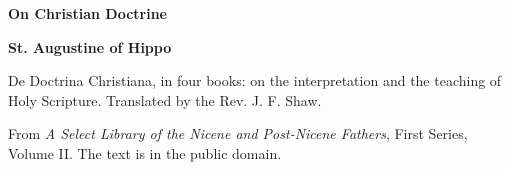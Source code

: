 \documentclass[11pt,letterpaper]{article}
\begin{document}
\color{ink}

\begin{titlepage}
\centering
\vspace*{4em}
{\LARGE\bfseries\color{heading} On Christian Doctrine\par}
\vspace{2em}
{\Large\bfseries\color{heading} St. Augustine of Hippo\par}
\vspace{2.5em}
{\itshape\color{subhead}\parbox{0.8\linewidth}{\centering De Doctrina Christiana, in four books: on the interpretation and the teaching of Holy Scripture. Translated by the Rev. J. F. Shaw.\par}}
\vfill
{\small From \emph{A Select Library of the Nicene and Post-Nicene Fathers}, First Series, Volume II. The text is in the public domain.\par}
\vspace{2em}
\end{titlepage}

\tableofcontents


\end{document}
